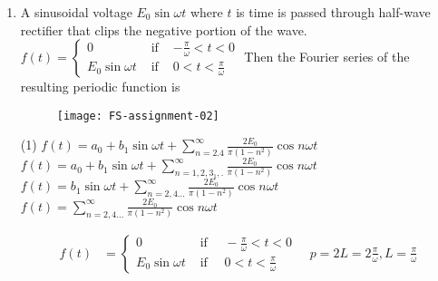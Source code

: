 \begin{enumerate}
\begin{answer}
\begin{align*}
	\end{align*}
	\begin{align}
	\text{Thus Fourier series is }f(x)&=\frac{\sinh \pi}{\pi} \sum_{n=-\infty}^{\infty}(-1)^{n}\left(\frac{1+i n}{1+n^{2}}\right) e^{i n x}\label{FS-01}
	\intertext{Let us derive the real Fourier series}\notag
	\because(1+i n) e^{i n x}&=(1+i n)(\cos n x+i \sin n x)=(\cos n x-n \sin n x)+i(\cos n x+\sin n x)\notag\\
	\because n\text{ varies from }&\text{ $-\infty$ to $+\infty$, equation (\ref{FS-01}) has corresponding term with $-n$ instead of $n$.}\notag
	\intertext{Thus}
	f(x)&=\frac{\sinh \pi}{\pi}+2 \frac{\sinh \pi}{\pi} \sum_{n=1}^{\infty}(-1)^{n} \frac{(\cos n x-n \sin n x)}{1+n^{2}}\notag\\
	f(x)&=\frac{2 \sinh \pi}{\pi}\left[\frac{1}{2}-\frac{1}{1+1^{2}}(\cos x-\sin x)+\frac{1}{1+2^{2}}(\cos 2 x-2 \sin 2 x)-+\ldots\right]\notag
	\end{align}
		So the correct option is \textbf{Option (d)}
\end{answer}
	\item  A sinusoidal voltage $E_{0} \sin \omega t$ where $t$ is time is passed through half-wave rectifier that clips the negative portion of the wave.
$f(t)=\left\{\begin{array}{ccc}0 & \text { if } & -\frac{\pi}{\omega}<t<0 \\ E_{0} \sin \omega t & \text { if } & 0<t<\frac{\pi}{\omega}\end{array}\right.$
	Then the Fourier series of the resulting periodic function is
	\begin{figure}[H]
		\centering
		\texttt{[image: FS-assignment-02]}
	\end{figure}
	 \begin{tasks}(1)
		\task[\textbf{a.}]$f(t)=a_{0}+b_{1} \sin \omega t+\sum_{n=2.4}^{\infty} \frac{2 E_{0}}{\pi\left(1-n^{2}\right)} \cos n \omega t$
		\task[\textbf{b.}] $f(t)=a_{0}+b_{1} \sin \omega t+\sum_{n=1,2,3_{1}, .}^{\infty} \frac{2 E_{0}}{\pi\left(1-n^{2}\right)} \cos n \omega t$
		\task[\textbf{c.}]$f(t)=b_{1} \sin \omega t+\sum_{n=2,4 \ldots}^{\infty} \frac{2 E_{0}}{\pi\left(1-n^{2}\right)} \cos n \omega t$
		\task[\textbf{d.}] $f(t)=\sum_{n=2,4 \ldots}^{\infty} \frac{2 E_{0}}{\pi\left(1-n^{2}\right)} \cos n \omega t$
	\end{tasks}
\begin{answer}
	\begin{align*}
	f(t)&=\left\{\begin{array}{cl}0 & \text { if } \quad-\frac{\pi}{\omega}<t<0 \\ E_{0} \sin \omega t & \text { if } \quad 0<t<\frac{\pi}{\omega}\end{array} \quad p=2 L=2 \frac{\pi}{\omega}, L=\frac{\pi}{\omega}\right.\\

\end{align*}
\end{answer}
\end{enumerate}

